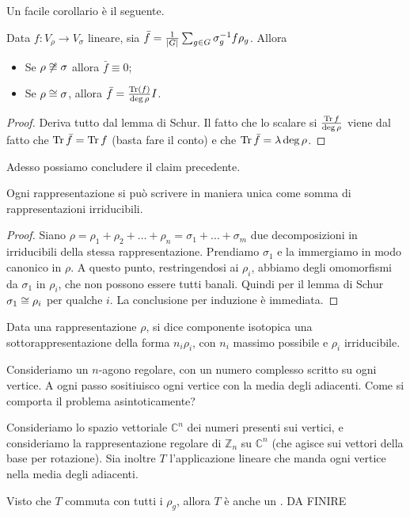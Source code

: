 \documentclass[a4paper,10pt,oneside]{math_article}
\newcommand{\Cyc}{\mathbb Z}
\newcommand{\id}{I}
\begin{document}
    Un facile corollario è il seguente.
    \begin{mycor}
     Data $f: V_\rho \rightarrow V_\sigma$ lineare, sia $\bar f = \frac 1{\left|G\right|} \sum_{g\in G} \sigma_g^{-1} f \rho_g$. Allora
     \begin{itemize}
      \item Se $\rho \not \cong \sigma$ allora $\bar f\equiv 0$;
      \item Se $\rho \cong \sigma$, allora $\bar f = \frac{\Tr(f)}{\deg \rho}\id$.
     \end{itemize}
    \end{mycor}
    \begin{proof}
     Deriva tutto dal lemma di Schur. Il fatto che lo scalare si $\frac{\operatorname{Tr} f}{\deg \rho}$ viene dal fatto che $\operatorname{Tr} \bar f = \operatorname{Tr} f$ (basta fare il conto) e che $\operatorname{Tr} \bar f = \lambda \deg \rho$.
    \end{proof}


    Adesso possiamo concludere il claim precedente.
    \begin{myprop}
     Ogni rappresentazione si può scrivere in maniera unica come somma di rappresentazioni irriducibili.
    \end{myprop}
    \begin{proof}
     Siano $\rho = \rho_1 + \rho_2 + \dots + \rho_n = \sigma_1 + \dots +\sigma_m$ due decomposizioni in irriducibili della stessa rappresentazione. Prendiamo $\sigma_1$ e la immergiamo in modo canonico in $\rho$. A questo punto, restringendosi ai $\rho_i$, abbiamo degli omomorfismi da $\sigma_1$ in $\rho_i$, che non possono essere tutti banali. Quindi per il lemma di Schur $\sigma_1\cong \rho_i$ per qualche $i$. La conclusione per induzione è immediata. 
    \end{proof}
    
    \begin{mydef}
     Data una rappresentazione $\rho$, si dice componente isotopica una sottorappresentazione della forma $n_i\rho_i$, con $n_i$ massimo possibile e $\rho_i$ irriducibile.
    \end{mydef}

  
  \begin{myex}
   Consideriamo un $n$-agono regolare, con un numero complesso scritto su ogni vertice. A ogni passo sositiuisco ogni vertice con la media degli adiacenti. Come si comporta il problema asintoticamente?
   
   Consideriamo lo spazio vettoriale $\mathbb C^n$ dei numeri presenti sui vertici, e consideriamo la rappresentazione regolare di $\Cyc_n$ su $\mathbb C^n$ (che agisce sui vettori della base per rotazione). Sia inoltre $T$ l'applicazione lineare che manda ogni vertice nella media degli adiacenti.
   
   Visto che $T$ commuta con tutti i $\rho_g$, allora $T$ è anche un . DA FINIRE
  \end{myex}
\end{document}
